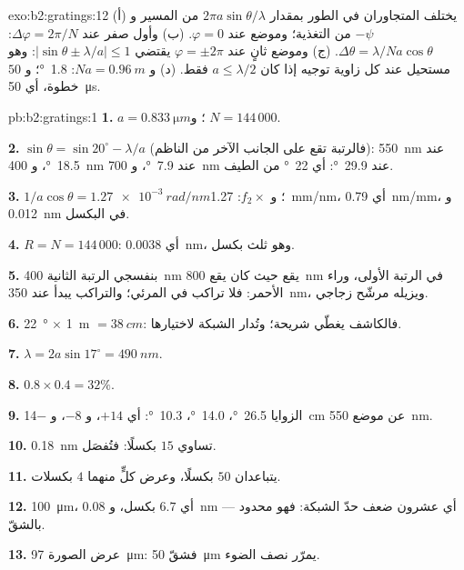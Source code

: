 \begin{solution}{exo:b2:gratings:12}
(أ) يختلف المتجاوران في الطور بمقدار $2\pi a\sin\theta/\lambda$ من المسير و $-\psi$
من التغذية؛ وموضع  عند $\varphi = 0$. (ب) وأول صفر عند
$\Delta\varphi = 2\pi/N$: $\Delta\theta = \lambda/Na\cos\theta$. (ج) وموضع  ثانٍ عند
$\varphi = \pm2\pi$ يقتضي $|\sin\theta \pm \lambda/a| \le 1$: وهو مستحيل عند كل زاوية
توجيه إذا كان $a \le \lambda/2$ فقط. (د) و $Na = \qty{0.96}{m}$: \qty{1.8}{\degree}؛ و $50$ خطوة،
أي \qty{50}{\micro s}.
\end{solution}

\begin{solution}{pb:b2:gratings:1}
\textbf{1.} $a = \qty{0.833}{\micro m}$؛ و $N = 144\,000$.

\textbf{2.} $\sin\theta = \sin20^\circ - \lambda/a$ (فالرتبة تقع على الجانب الآخر من
الناظم): \qty{550}{nm} عند \qty{18.5}{\degree}، و \qty{400}{nm} عند \qty{7.9}{\degree}، و \qty{700}{nm} عند
\qty{29.9}{\degree}: أي \qty{22}{\degree} من الطيف.

\textbf{3.} $1/a\cos\theta = \qty{1.27e-3}{rad/nm}$؛ و $f_2\times$: \qty{1.27}{mm/nm}، أي
\qty{0.79}{nm/mm}، و \qty{0.012}{nm} في البكسل.

\textbf{4.} $R = N = 144\,000$: أي \qty{0.0038}{nm}، وهو ثلث بكسل.

\textbf{5.} بنفسجي الرتبة الثانية \qty{400}{nm} يقع حيث كان يقع \qty{800}{nm}
في الرتبة الأولى، وراء الأحمر: فلا تراكب في المرئي؛ والتراكب
يبدأ عند \qty{350}{nm}، ويزيله مرشّح زجاجي.

\textbf{6.} \qty{22}{\degree} $\times$ \qty{1}{m} $= \qty{38}{cm}$: فالكاشف يغطّي شريحة؛
وتُدار الشبكة لاختيارها.

\textbf{7.} $\lambda = 2a\sin17^\circ = \qty{490}{nm}$.

\textbf{8.} $0.8 \times 0.4 = 32\%$.

\textbf{9.} الزوايا \qty{26.5}{\degree}، \qty{14.0}{\degree}، \qty{10.3}{\degree}: أي $+14$، و $-8$، و
\qty{-14}{cm} عن موضع \qty{550}{nm}.

\textbf{10.} \qty{0.18}{nm} تساوي $15$ بكسلًا: فتُفصَل.

\textbf{11.} يتباعدان $50$ بكسلًا، وعرض كلٍّ منهما $4$ بكسلات.

\textbf{12.} \qty{100}{\micro m}، أي $6.7$ بكسل، و \qty{0.08}{nm} --- أي عشرون ضعف
حدّ الشبكة: فهو محدود بالشقّ.

\textbf{13.} عرض الصورة \qty{97}{\micro m}: فشقّ \qty{50}{\micro m} يمرّر
نصف الضوء.


\end{solution}
